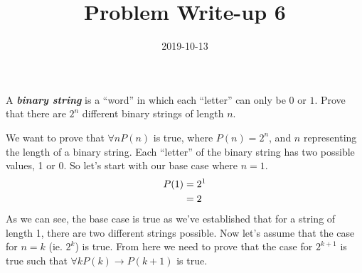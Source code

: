 \documentclass[a4paper,12pt]{article}
\title{Problem Write-up 6}
\date{2019-10-13}
\begin{document}
    \begin{problem}
        A \textbf{\textit{binary string}} is a “word” in which each “letter” can only be \(0\) or \(1\). Prove that there are \(2^n\) different binary strings of length \(n\).
    \end{problem}
    \begin{answer}
        We want to prove that \(\forall n P(n)\) is true, where \(P(n) = 2^n\), and \(n\) representing the length of a binary string. Each “letter” of the binary string has two possible values, 1 or 0. So let's start with our base case where \(n = 1\).
    	\begin{align}
            P(1) &= 2^1 \notag\\
            &= 2
    	\end{align}
	    As we can see, the base case is true as we've established that for a string of length 1, there are two different strings possible. Now let's assume that the case for \(n = k\) (ie. \(2^k\)) is true. From here we need to prove that the case for \(2^{k + 1}\) is true such that \(\forall k P(k) \rightarrow P(k + 1)\) is true.
    \end{answer}
\end{document}
